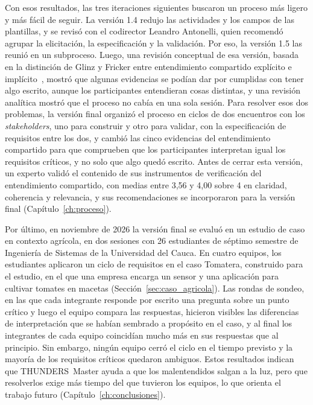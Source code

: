 \documentclass[12pt,letterpaper,oneside]{report}
\begin{document}
Con esos resultados, las tres iteraciones siguientes buscaron un proceso más
ligero y más fácil de seguir. La versión 1.4 redujo las actividades y los campos
de las plantillas, y se revisó con el codirector Leandro Antonelli, quien
recomendó agrupar la elicitación, la especificación y la validación. Por eso, la
versión 1.5 las reunió en un subproceso. Luego, una revisión conceptual de esa
versión, basada en la distinción de Glinz y Fricker entre entendimiento
compartido explícito e implícito~\cite{glinz2015shared}, mostró que algunas
evidencias se podían dar por cumplidas con tener algo escrito, aunque los
participantes entendieran cosas distintas, y una revisión analítica mostró que
el proceso no cabía en una sola sesión. Para resolver esos dos problemas, la
versión final organizó el proceso en ciclos de dos encuentros con los
\textit{stakeholders}, uno para construir y otro para validar, con la
especificación de requisitos entre los dos, y cambió las cinco evidencias del
entendimiento compartido para que comprueben que los participantes interpretan
igual los requisitos críticos, y no solo que algo quedó escrito. Antes de cerrar
esta versión, un experto validó el contenido de sus instrumentos de verificación
del entendimiento compartido, con medias entre 3,56 y 4,00 sobre 4 en claridad,
coherencia y relevancia, y sus recomendaciones se incorporaron para la versión
final (Capítulo~\ref{ch:proceso}).

Por último, en noviembre de 2026 la versión final se evaluó en un estudio de
caso en contexto agrícola, en dos sesiones con 26 estudiantes de séptimo
semestre de Ingeniería de Sistemas de la Universidad del Cauca. En cuatro equipos, los estudiantes aplicaron
un ciclo de requisitos en el caso Tomatera, construido para el estudio, en el
que una empresa encarga un sensor y una aplicación para cultivar tomates en
macetas (Sección~\ref{sec:caso_agricola}). Las rondas de sondeo, en las que cada
integrante responde por escrito una pregunta sobre un punto crítico y luego el
equipo compara las respuestas, hicieron visibles las diferencias de
interpretación que se habían sembrado a propósito en el caso, y al final los
integrantes de cada equipo coincidían mucho más en sus respuestas que al
principio. Sin embargo, ningún equipo cerró el ciclo en el tiempo previsto y la
mayoría de los requisitos críticos quedaron ambiguos. Estos resultados indican
que THUNDERS~Master ayuda a que los malentendidos salgan a la luz, pero que
resolverlos exige más tiempo del que tuvieron los equipos, lo que orienta el
trabajo futuro (Capítulo~\ref{ch:conclusiones}).
\end{document}
